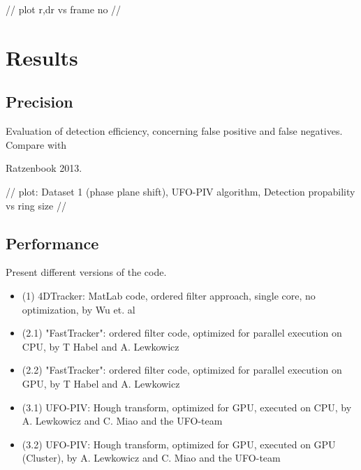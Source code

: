 // plot r,dr vs frame no //





\section{Results}



\subsection{Precision}



Evaluation of detection efficiency, concerning false positive and false negatives. Compare with 

Ratzenbook 2013.



// plot: Dataset 1 (phase plane shift), UFO-PIV algorithm, Detection propability vs ring size //







\subsection{Performance}



Present different versions of the code.



\begin{itemize}

    \item (1) 4DTracker: MatLab code, ordered filter approach, single core, no optimization, by Wu et. al

    \item (2.1) "FastTracker": ordered filter code, optimized for parallel execution on CPU, by T Habel and A. Lewkowicz

    \item (2.2) "FastTracker": ordered filter code, optimized for parallel execution on GPU, by T Habel and A. Lewkowicz

    \item (3.1) UFO-PIV: Hough transform, optimized for GPU, executed on CPU, by A. Lewkowicz and C. Miao and the UFO-team

    \item (3.2) UFO-PIV: Hough transform, optimized for GPU, executed on GPU (Cluster), by A. Lewkowicz and C. Miao and the UFO-team

\end{itemize}



